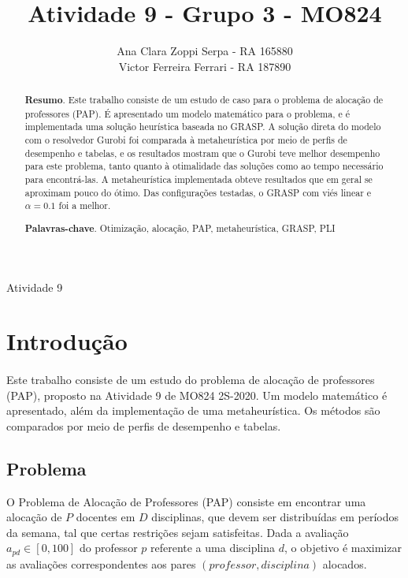 \documentclass{MO824}
\title{Atividade 9 - Grupo 3 - MO824}
\author{
    Ana Clara Zoppi Serpa   - RA 165880\\
    Victor Ferreira Ferrari - RA 187890
}
\begin{document}
    

    



\criartitulo

%
{Atividade 9}

\begin{abstract}
{\bf Resumo}. Este trabalho consiste de um estudo de caso para o problema de alocação de professores (PAP). É apresentado um modelo matemático para o problema, e é implementada uma solução heurística baseada no GRASP. A solução direta do modelo com o resolvedor Gurobi foi comparada à metaheurística por meio de perfis de desempenho e tabelas, e os resultados mostram que o Gurobi teve melhor desempenho para este problema, tanto quanto à otimalidade das soluções como ao tempo necessário para encontrá-las. A metaheurística implementada obteve resultados que em geral se aproximam pouco do ótimo. Das configurações testadas, o GRASP com viés linear e $\alpha=0.1$ foi a melhor.

{\bf Palavras-chave}. Otimização, alocação, PAP, metaheurística, GRASP, PLI

\end{abstract}

\section{Introdução}
    \paragraph*{}
    Este trabalho consiste de um estudo do problema de alocação de professores (PAP), proposto na Atividade 9 de MO824 2S-2020. Um modelo matemático é apresentado, além da implementação de uma metaheurística. Os métodos são comparados por meio de perfis de desempenho e tabelas.
    
    \subsection{Problema} \label{problem}
    O Problema de Alocação de Professores (PAP) consiste em encontrar uma alocação de $P$ docentes em $D$ disciplinas, que devem ser distribuídas em períodos da semana, tal que certas restrições sejam satisfeitas. Dada a avaliação $a_{pd} \in [0,100]$ do professor $p$ referente a uma disciplina $d$, o objetivo é maximizar as avaliações correspondentes aos pares $(professor,disciplina)$ alocados. 
    
\end{document}
